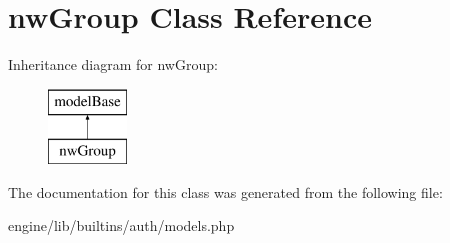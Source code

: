 \hypertarget{classnwGroup}{\section{nw\-Group Class Reference}
\label{classnwGroup}
}
Inheritance diagram for nw\-Group\-:\begin{figure}[H]
\begin{center}
\leavevmode
\includegraphics[height=2.000000cm]{classnwGroup}
\end{center}
\end{figure}


The documentation for this class was generated from the following file\-:\begin{DoxyCompactItemize}
\item 
engine/lib/builtins/auth/models.\-php\end{DoxyCompactItemize}
